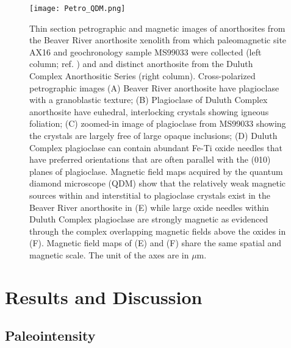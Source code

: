 \documentclass[9pt,twocolumn,twoside,lineno]{pnas-new}
\begin{document}
\begin{figure}
\centering
\noindent\texttt{[image: Petro\_QDM.png]}
\caption{\footnotesize{Thin section petrographic and magnetic images of anorthosites from the Beaver River anorthosite xenolith from which paleomagnetic site AX16 and geochronology sample MS99033 were collected (left column; ref. \citealp{Zhang2021b}) and and distinct anorthosite from the Duluth Complex Anorthositic Series (right column). Cross-polarized petrographic images (A) Beaver River anorthosite have plagioclase with a granoblastic texture; (B) Plagioclase of Duluth Complex anorthosite have euhedral, interlocking crystals showing igneous foliation; (C) zoomed-in image of plagioclase from MS99033 showing the crystals are largely free of large opaque inclusions; (D) Duluth Complex plagioclase can contain abundant Fe-Ti oxide needles that have preferred orientations that are often parallel with the (010) planes of plagioclase. Magnetic field maps acquired by the quantum diamond microscope (QDM) show that the relatively weak magnetic sources within and interstitial to plagioclase crystals exist in the Beaver River anorthosite in (E) while large oxide needles within Duluth Complex plagioclase are strongly magnetic as evidenced through the complex overlapping magnetic fields above the oxides in (F). Magnetic field maps of (E) and (F) share the same spatial and magnetic scale. The unit of the axes are in $\mu$m.}}
\label{fig:Petro_QDM}
\end{figure}


\section*{Results and Discussion}

\subsection*{Paleointensity}
\end{document}
